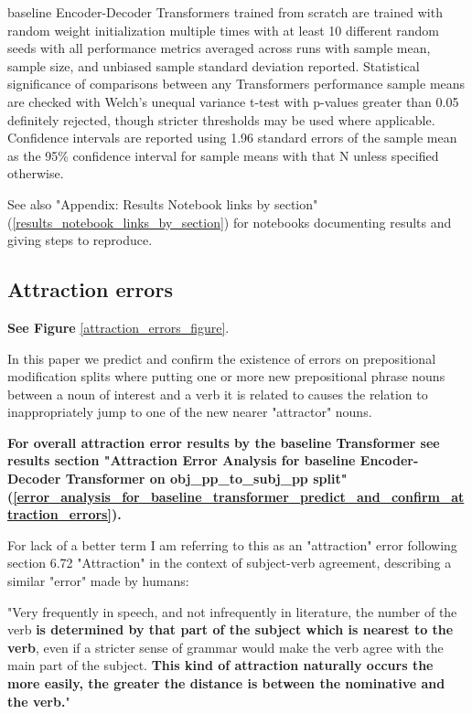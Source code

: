 \documentclass[11pt]{article}
\begin{document}
\citep{Wu2023} baseline Encoder-Decoder Transformers trained from scratch are trained with random weight initialization multiple times with at least 10 different random seeds with all performance metrics averaged across runs with sample mean, sample size, and unbiased sample standard deviation reported. Statistical significance of comparisons between any Transformers performance sample means are checked with Welch's unequal variance t-test with p-values greater than 0.05 definitely rejected, though stricter thresholds may be used where applicable. Confidence intervals are reported using 1.96 standard errors of the sample mean as the 95\% confidence interval for sample means with that N unless specified otherwise.

See also "Appendix: Results Notebook links by section" (\ref{results_notebook_links_by_section}) for notebooks documenting results and giving steps to reproduce.
\subsection{Attraction errors}
\label{attraction_errors}

\textbf{See Figure} \ref{attraction_errors_figure}.

In this paper we predict and confirm the existence of errors on prepositional modification splits where putting one or more new prepositional phrase nouns between a noun of interest and a verb it is related to causes the relation to inappropriately jump to one of the new nearer "attractor" nouns. 

\textbf{For overall attraction error results by the baseline Transformer see results section "Attraction Error Analysis for \citep{Wu2023} baseline Encoder-Decoder Transformer on obj\_pp\_to\_subj\_pp split" (\ref{error_analysis_for_baseline_transformer_predict_and_confirm_attraction_errors}).}

For lack of a better term I am referring to this as an "attraction" error following \citep{jespersen1913modernenglishgrammar1954reprint} section 6.72 "Attraction" in the context of subject-verb agreement, describing a similar "error" made by humans:

"Very frequently in speech, and not infrequently in
literature, the number of the verb \textbf{is determined by
that part of the subject which is nearest to the verb},
even if a stricter sense of grammar would make
the verb agree with the main part of the subject.
\textbf{This kind of attraction naturally occurs the more easily, the greater the distance is between the nominative and the verb.}"
\end{document}
